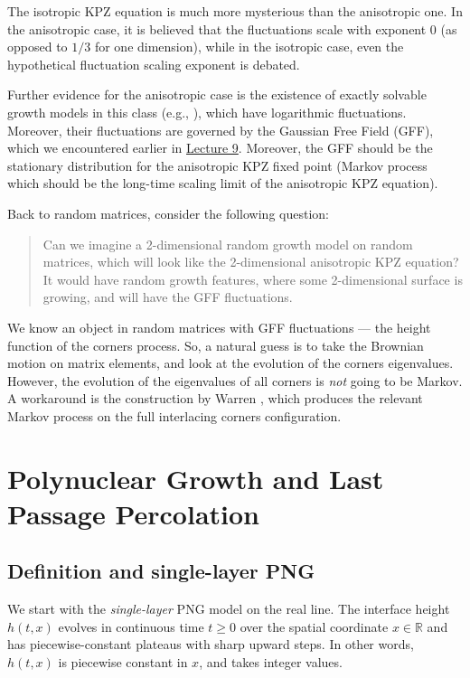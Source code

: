 \documentclass[letterpaper,11pt,oneside,reqno]{article}
\numberwithin{equation}{section}
\theoremstyle{definition}
\begin{document}
The isotropic KPZ equation is much more mysterious than the anisotropic one.
In the anisotropic case, it is believed that the
fluctuations scale with exponent $0$
(as opposed to $1/3$ for one dimension),
while in the isotropic case, even the hypothetical fluctuation scaling exponent is debated.

Further evidence for the anisotropic case is the existence of exactly
solvable growth models in this class (e.g., \cite{BorFerr2008DF}),
which have logarithmic fluctuations. Moreover, their fluctuations
are governed by the Gaussian Free Field (GFF), which we encountered earlier in
\href{https://lpetrov.cc/rmt25/rmt2025-l9.pdf}{Lecture 9}.
Moreover, the GFF should be the stationary distribution for the anisotropic
KPZ fixed point (Markov process which should be the long-time scaling limit
of the anisotropic KPZ equation).

Back to random matrices, consider the following question:
\begin{quote}
	Can we imagine a 2-dimensional random growth model
	on random matrices, which will look like the 2-dimensional anisotropic KPZ equation?
	It would have random growth features, where some 2-dimensional surface is growing,
	and will have the GFF fluctuations.
\end{quote}

We know an object in random matrices
with GFF fluctuations --- the height function of the corners process.
So, a natural guess is to take the Brownian motion on matrix elements,
and look at the evolution of the corners eigenvalues. However,
the evolution of the eigenvalues of all corners is \emph{not}
going to be Markov.
A workaround is the construction by Warren \cite{warren2005dyson},
which produces the relevant Markov process on the full
interlacing corners configuration.

\section{Polynuclear Growth and Last Passage Percolation}
\label{sec:PNG}

\subsection{Definition and single-layer PNG}
\label{sub:PNG-definition}
We start with the \emph{single-layer} PNG model on the real line. The interface height $h(t,x)$ evolves in continuous time $t\ge0$ over the spatial coordinate $x\in\mathbb{R}$ and has piecewise-constant plateaus with sharp upward steps.
In other words, $h(t,x)$ is piecewise constant in $x$, and takes integer values.
\end{document}
